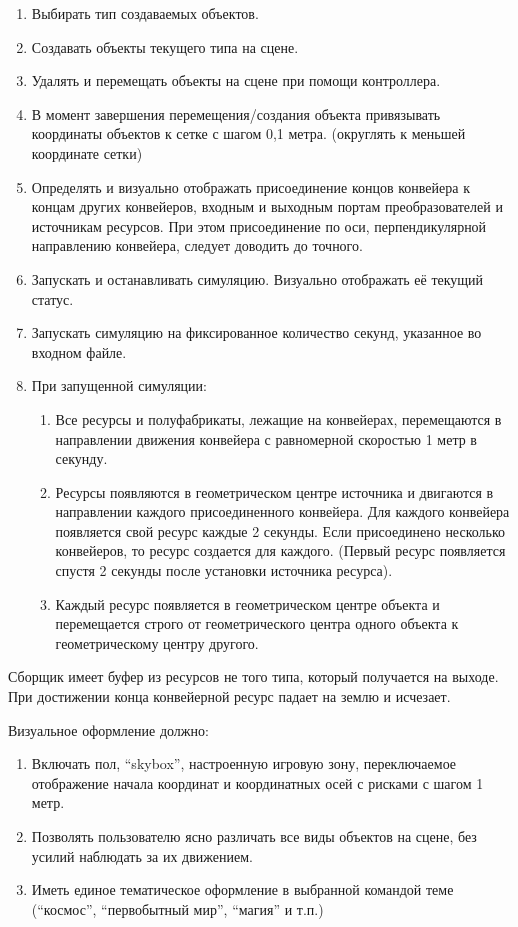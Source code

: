 \begin{enumerate}
    \item Выбирать тип создаваемых объектов.
    \item Создавать объекты текущего типа на сцене.
    \item Удалять и перемещать объекты на сцене при помощи контроллера.
    \item В момент завершения перемещения/создания объекта привязывать координаты объектов к сетке с шагом 0,1 метра. (округлять к меньшей координате сетки)
    \item Определять и визуально отображать присоединение концов конвейера к концам других конвейеров, входным и выходным портам преобразователей и источникам ресурсов. При этом присоединение по оси, перпендикулярной направлению конвейера, следует доводить до точного.
    \item Запускать и останавливать симуляцию. Визуально отображать её текущий статус.
    \item Запускать симуляцию на фиксированное количество секунд, указанное во входном файле.
    \item При запущенной симуляции:
    \begin{enumerate}
        \item Все ресурсы и полуфабрикаты, лежащие на конвейерах, перемещаются в направлении движения конвейера с равномерной скоростью 1 метр в секунду.
        \item Ресурсы появляются в геометрическом центре источника и двигаются в направлении каждого присоединенного конвейера. Для каждого конвейера появляется свой ресурс каждые 2 секунды. Если присоединено несколько конвейеров, то ресурс создается для каждого. (Первый ресурс появляется спустя 2 секунды после установки источника ресурса).
        \item Каждый ресурс появляется в геометрическом центре объекта и перемещается строго от геометрического центра одного объекта к геометрическому центру другого.                        
    \end{enumerate}
\end{enumerate}


Сборщик имеет буфер из ресурсов не того типа, который получается на выходе.
При достижении конца конвейерной ресурс падает на землю и исчезает.

Визуальное оформление должно:
\begin{enumerate}
    \item Включать пол, “skybox”, настроенную игровую зону, переключаемое отображение начала координат и координатных осей с рисками с шагом 1 метр.
    \item Позволять пользователю ясно различать все виды объектов на сцене, без усилий наблюдать за их движением.
    \item Иметь единое тематическое оформление в выбранной командой теме (“космос”, “первобытный мир”, “магия” и т.п.)        
\end{enumerate}

